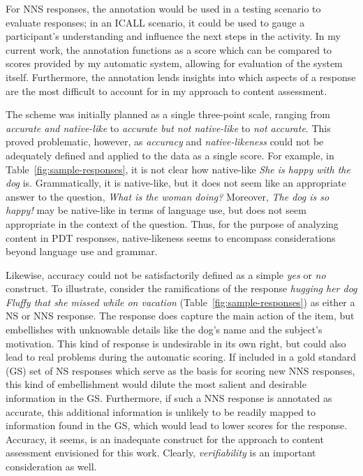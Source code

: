 For NNS responses, the annotation would be used in a testing scenario to evaluate responses; in an ICALL scenario, it could be used to gauge a participant's understanding and influence the next steps in the activity. In my current work, the annotation functions as a score which can be compared to scores provided by my automatic system, allowing for evaluation of the system itself. Furthermore, the annotation lends insights into which aspects of a response are the most difficult to account for in my approach to content assessment.

The scheme was initially planned as a single three-point scale, ranging from \textit{accurate and native-like} to \textit{accurate but not native-like} to \textit{not accurate}. This proved problematic, however, as \textit{accuracy} and \textit{native-likeness} could not be adequately defined and applied to the data as a single score.
For example, in Table~\ref{fig:sample-responses}, it is not clear how native-like \textit{She is happy with the dog} is.  Grammatically, it is native-like, but it does not seem like an appropriate answer to the question, \textit{What is the woman doing?} Moreover, \textit{The dog is so happy!} may be native-like in terms of language use, but does not seem appropriate in the context of the question. Thus, for the purpose of analyzing content in PDT responses, native-likeness seems to encompass considerations beyond language use and grammar. 

Likewise, accuracy could not be satisfactorily defined as a simple \textit{yes} or \textit{no} construct. To illustrate, consider the ramifications of the response \textit{hugging her dog Fluffy that she missed while on vacation} (Table~\ref{fig:sample-responses}) as either a NS or NNS response. The response does capture the main action of the item, but embellishes with unknowable details like the dog's name and the subject's motivation. This kind of response is undesirable in its own right, but could also lead to real problems during the automatic scoring. If included in a gold standard (GS) set of NS responses which serve as the basis for scoring new NNS responses, this kind of embellishment would dilute the most salient and desirable information in the GS. Furthermore, if such a NNS response is annotated as accurate, this additional information is unlikely to be readily mapped to information found in the GS, which would lead to lower scores for the response. Accuracy, it seems, is an inadequate construct for the approach to content assessment envisioned for this work. Clearly, \textit{verifiability} is an important consideration as well.

